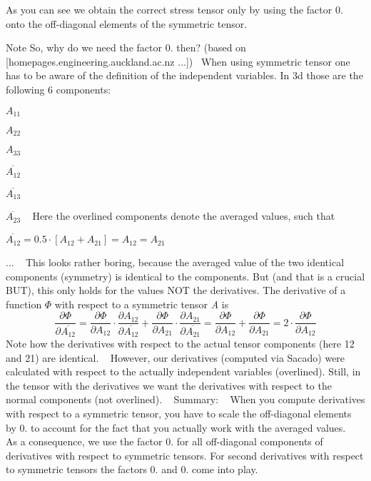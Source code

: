 As you can see we obtain the correct stress tensor only by using the factor 0. onto the off-\/diagonal elements of the symmetric tensor. ~\newline
\begin{DoxyNote}{Note}
So, why do we need the factor 0. then? (based on \mbox{[}homepages.\+engineering.\+auckland.\+ac.\+nz ...\mbox{]})~\newline
When using symmetric tensor one has to be aware of the definition of the independent variables. In 3d those are the following 6 components\+: ~\newline

\begin{DoxyItemize}
\item $ A_{11} $
\item $ A_{22} $
\item $ A_{33} $
\item $ \overline{A_{12}} $
\item $ \overline{A_{13}} $
\item $ \overline{A_{23}} $ ~\newline
Here the overlined components denote the averaged values, such that
\item $ \overline{A_{12}} = 0.5 \cdot [ A_{12} + A_{21} ] = A_{12} = A_{21} $
\item ... ~\newline
This looks rather boring, because the averaged value of the two identical components (symmetry) is identical to the components. But (and that is a crucial B\+UT), this only holds for the values N\+OT the derivatives. The derivative of a function $ \Phi $ with respect to a symmetric tensor {\itshape A} is \[ \frac{\partial \Phi}{\partial \overline{A_{12}}} = \frac{\partial \Phi}{\partial A_{12}} \cdot \frac{\partial A_{12}}{\partial \overline{A_{12}}} + \frac{\partial \Phi}{\partial A_{21}} \cdot \frac{\partial A_{21}}{\partial \overline{A_{21}}} = \frac{\partial \Phi}{\partial A_{12}} + \frac{\partial \Phi}{\partial A_{21}} = 2 \cdot \frac{\partial \Phi}{\partial A_{12}} \] Note how the derivatives with respect to the actual tensor components (here 12 and 21) are identical. ~\newline
However, our derivatives (computed via Sacado) were calculated with respect to the actually independent variables (overlined). Still, in the tensor with the derivatives we want the derivatives with respect to the normal components (not overlined). ~\newline
Summary\+: ~\newline
When you compute derivatives with respect to a symmetric tensor, you have to scale the off-\/diagonal elements by 0. to account for the fact that you actually work with the averaged values. ~\newline
As a consequence, we use the factor 0. for all off-\/diagonal components of derivatives with respect to symmetric tensors. For second derivatives with respect to symmetric tensors the factors 0. and 0. come into play.
\end{DoxyItemize}
\end{DoxyNote}

